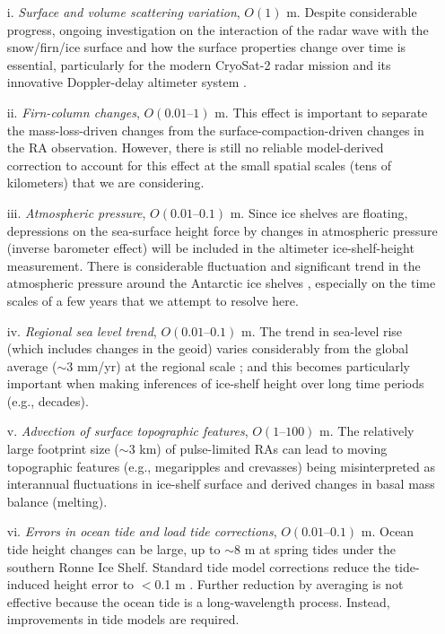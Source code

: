 \begin{itemize}
  \item[i.]     {\it Surface and volume scattering variation}, $O(1)$ m. Despite considerable progress, ongoing investigation on the interaction of the radar wave with the snow/firn/ice surface and how the surface properties change over time is essential, particularly for the modern CryoSat-2 radar mission and its innovative Doppler-delay altimeter system \parencite{Wingham2006}.
  \item[ii.] 	{\it Firn-column changes}, $O(\text{0.01--1})$ m. This effect is important to separate the mass-loss-driven changes from the surface-compaction-driven changes in the RA observation. However, there is still no reliable model-derived correction to account for this effect at the small spatial scales (tens of kilometers) that we are considering.
  \item[iii.]   {\it Atmospheric pressure}, $O(\text{0.01--0.1})$ m. Since ice shelves are floating, depressions on the sea-surface height force by changes in atmospheric pressure (inverse barometer effect) will be included in the altimeter ice-shelf-height measurement. There is considerable fluctuation and significant trend in the atmospheric pressure around the Antarctic ice shelves \parencite{Padman2003}, especially on the time scales of a few years that we attempt to resolve here.
  \item[iv.]    {\it Regional sea level trend}, $O(\text{0.01--0.1})$ m. The trend in sea-level rise (which includes changes in the geoid) varies considerably from the global average ($\sim$3 mm/yr) at the regional scale \parencite{Church2004}; and this becomes particularly important when making inferences of ice-shelf height over long time periods (e.g., decades).
  \item[v.]     {\it Advection of surface topographic features}, $O(\text{1--100})$ m. The relatively large footprint size ($\sim$3 km) of pulse-limited RAs can lead to moving topographic features (e.g., megaripples and crevasses) being misinterpreted as interannual fluctuations in ice-shelf surface and derived changes in basal mass balance (melting).
  \item[vi.]    {\it Errors in ocean tide and load tide corrections}, $O(\text{0.01--0.1})$ m. Ocean tide height changes can be large, up to $\sim$8 m at spring tides under the southern Ronne Ice Shelf. Standard tide model corrections reduce the tide-induced height error to $<$0.1 m \parencite{King2005, King2011, Stammer2014}. Further reduction by averaging is not effective because the ocean tide is a long-wavelength process. Instead, improvements in tide models are required.
\end{itemize}


